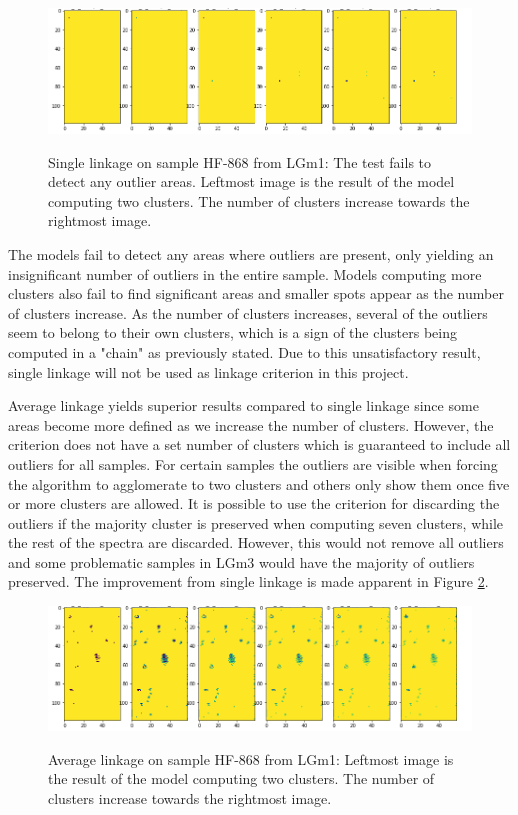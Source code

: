 \begin{figure}[H]

    \centering
{\includegraphics[width=15cm]{images/Single_linkage/LGm-1/HF-868_1_2.h5_0.png} }
\caption{Single linkage on sample HF-868 from LGm1: The test fails to detect any outlier areas. Leftmost image is the result of the model computing two clusters. The number of clusters increase towards the rightmost image.\label{fig:SL_HF868}}%

\end{figure}

The models fail to detect any areas where outliers are present, only yielding an insignificant number of outliers in the entire sample. Models computing more clusters also fail to find significant areas and smaller spots appear as the number of clusters increase. As the number of clusters increases, several of the outliers seem to belong to their own clusters, which is a sign of the clusters being computed in a "chain" as previously stated. Due to this unsatisfactory result, single linkage will not be used as linkage criterion in this project.


Average linkage yields superior results compared to single linkage since some areas become more defined as we increase the number of clusters. However, the criterion does not have a set number of clusters which is guaranteed to include all outliers for all samples. For certain samples the outliers are visible when forcing the algorithm to agglomerate to two clusters and others only show them once five or more clusters are allowed. It is possible to use the criterion for discarding the outliers if the majority cluster is preserved when computing seven clusters, while the rest of the spectra are discarded. However, this would not remove all outliers and some problematic samples in LGm3 would have the majority of outliers preserved. The improvement from single linkage is made apparent in Figure \ref{fig:AL_HF868}.

\begin{figure}[H]

    \centering
{\includegraphics[width=15cm]{images/Average_linkage/LGm-1/HF-868_1_2.h5_0.png} }
\caption{Average linkage on sample HF-868 from LGm1: Leftmost image is the result of the model computing two clusters. The number of clusters increase towards the rightmost image.\label{fig:AL_HF868}}%

\end{figure}

